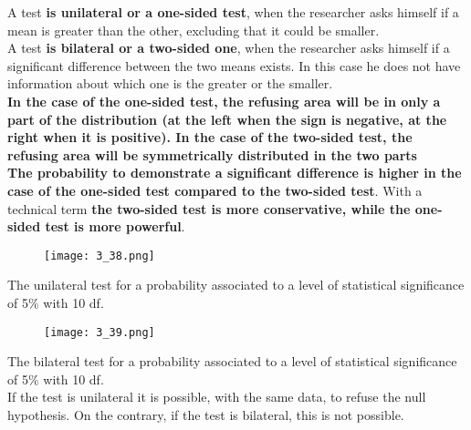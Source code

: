 \begin{frame}
  \begin{small}
    \vspace*{.25cm}
    A test \textbf{is unilateral or a one-sided test}, when the researcher asks himself if a mean is greater than the other, excluding that it could be smaller.\\
    \vspace*{.25cm}
    A test \textbf{is bilateral or a two-sided one}, when the researcher asks himself if a significant difference between the two means exists. In this case he does not have information about which one is the greater or the smaller. \\
    \vspace*{.25cm}
    \textbf{In the case of the one-sided test, the refusing area will be in only a part of the distribution (at the left when the sign is negative, at the right when it is positive). In the case of the two-sided test, the refusing area will be symmetrically distributed in the two parts}\\
    \textbf{The probability to demonstrate a significant difference is higher in the case of the one-sided test compared to the two-sided test}. With a technical term \textbf{the two-sided test is more conservative, while the one-sided test is more powerful}.
  \end{small}
\end{frame}

\begin{frame}
  \vspace*{.5cm}
  \begin{figure}
    \texttt{[image: 3\_38.png]}
  \end{figure}
  The unilateral test for a probability associated to a level of statistical significance of 5$ \% $ with 10 df.
\end{frame}

\begin{frame}
  \begin{figure}
    \texttt{[image: 3\_39.png]}
  \end{figure}
  The bilateral test for a probability associated to a level of statistical significance of 5$ \% $ with 10 df.\\
  \vspace*{.25cm}
  If the test is unilateral it is possible, with the same data, to refuse the null hypothesis. On the contrary, if the test is bilateral, this is not possible.
\end{frame}

